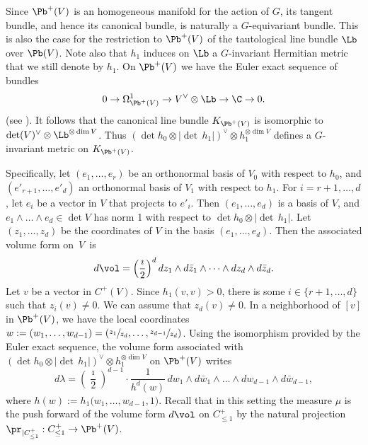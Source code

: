 Since $\Pb^+(V)$ is an homogeneous manifold for the action of $G$, its tangent bundle, and hence its canonical bundle, is naturally a $G$-equivariant bundle. This is also the case for the restriction to $\Pb^+(V)$ of the tautological line bundle $\Lb$ over $\Pb(V)$.
Note also that $h_1$ induces on $\Lb$ a $G$-invariant Hermitian metric that we still denote by $h_1$.
On $\Pb^+(V)$ we have the Euler exact sequence of bundles
\[
0\to \Omega^1_{\Pb^+(V)}\to V^\vee\otimes \Lb\to \C \to 0.
\]
(see \cite[Th.\,II.8.13]{Hart}). It follows that the canonical line bundle $K_{\Pb^+(V)}$ is isomorphic to $\det(V)^\vee\otimes \Lb^{\otimes\dim V}$. Thus $(\det h_0 \otimes |{\det\,} h_1| )^\vee \otimes h_1^{\otimes \dim V }$ defines a $G$-invariant metric on $K_{\Pb^+(V)}$.

Specifically, let $(e_1,\dots,e_r)$ be an orthonormal basis of $V_0$ with respect to $h_0$, and $(e'_{r+1},\dots,e'_d)$ an orthonormal basis of $V_1$ with respect to $h_1$. For $i=r+1,\dots,d$, let $e_i$ be a vector in $V$ that projects to $e'_i$.
Then $(e_1,\dots,e_d)$ is a basis of $V$, and $e_1\wedge\dots\wedge e_d \in \det V$ has norm 1 with respect to $\det h_0 \otimes |{\det\,} h_1|$.
Let $(z_1,\dots,z_d)$ be the coordinates of $V$ in the basis $(e_1,\dots,e_d)$.
Then the associated volume form on~$V$~is
\[
d\vol=\left(\frac{\imath}{2}\right)^{d} dz_1\wedge d\bar{z}_1\wedge\dots\wedge dz_{d}\wedge d\bar{z}_{d}.
\]
Let $v$ be a vector in $C^+(V)$. Since $h_1(v,v)>0$, there is some $i\in \{r+1,\dots,d\}$ such that $z_i(v)\not=0$.
We can assume that $z_d(v)\neq 0$.
In a neighborhood of $[v]$ in $\Pb^+(V)$, we have the local coordinates $w:=(w_1,\dots,w_{d-1})=(\sfrac{z_1}{z_d},\dots,\sfrac{z_{d-1}}{z_d})$. Using the isomorphism provided by the Euler exact sequence, the volume form associated with $(\det h_0 \otimes |{\det\,} h_1| )^\vee \otimes h_1^{\otimes \dim V}$ on $\Pb^+(V)$ writes
\[
d\lambda= \left(\frac{\imath}{2}\right)^{d-1}\cdot\frac{1}{h^d(w)}\, dw_1\wedge d\bar{w}_1\wedge \dots \wedge dw_{d-1}\wedge d\bar{w}_{d-1},
\]
where $h(w):=h_1\bigl(w_1,\dots,w_{d-1},1\bigr)$.
Recall that in this setting the measure $\mu$ is the push forward of the volume form $d\vol$ on $C^+_{\leq 1}$ by the natural projection $\pr_{|C^+_{\leq 1}}: C^+_{\leq 1} \to \Pb^+(V)$.

